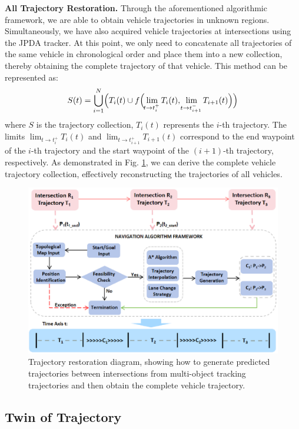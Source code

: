 \documentclass[journal,twoside,web]{ieeecolor}
\begin{document}
\textbf{All Trajectory Restoration.}
Through the aforementioned algorithmic framework, we are able to obtain vehicle trajectories in unknown regions. 
Simultaneously, we have also acquired vehicle trajectories at intersections using the JPDA tracker. 
At this point, we only need to concatenate all trajectories of the same vehicle in chronological order and place them into a new collection, thereby obtaining the complete trajectory of that vehicle. 
This method can be represented as: 
\begin{align}
	S(t) = \bigcup_{i=1}^{N} \Bigl( T_i(t) \cup f\Bigl( \lim_{\!t \to t_i^+} T_i(t), \lim_{\!t \to t_{i+1}^-} T_{i+1}(t) \Bigr) \Bigr)
\end{align}
where \(S\) is the trajectory collection, \(T_i(t)\) represents the \(i\)-th trajectory. 
The limits \(\lim_{t \to t_i^+} T_i(t)\) and \(\lim_{t \to t_{i+1}^+} T_{i+1}(t)\) correspond to the end waypoint of the \(i\)-th trajectory and the start waypoint of the \((i+1)\)-th trajectory, respectively.
As demonstrated in Fig. \ref{fig:5}, we can derive the complete vehicle trajectory collection, effectively reconstructing the trajectories of all vehicles.
\begin{figure}[!t]
	\centerline{\includegraphics[width=\columnwidth]{picture/picture5.eps}}
	\caption{Trajectory restoration diagram, showing how to generate predicted trajectories between intersections from multi-object tracking trajectories and then obtain the complete vehicle trajectory.} 
	\label{fig:5} 
\end{figure}

\subsection{Twin of Trajectory}
\end{document}
